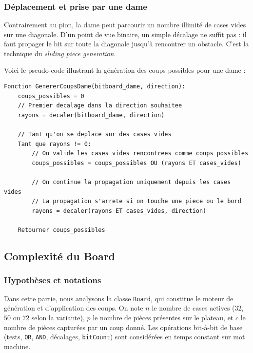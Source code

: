 \documentclass[a4paper]{article}
\begin{document}
\subsubsection{Déplacement et prise par une dame}

Contrairement au pion, la dame peut parcourir un nombre illimité de cases vides sur une diagonale. 
D'un point de vue binaire, un simple décalage ne suffit pas : il faut propager le bit sur toute la diagonale 
jusqu'à rencontrer un obstacle. C'est la technique du \textit{sliding piece generation}.

Voici le pseudo-code illustrant la génération des coups possibles pour une dame :

{ \small
\begin{verbatim}
Fonction GenererCoupsDame(bitboard_dame, direction):
    coups_possibles = 0
    // Premier decalage dans la direction souhaitee
    rayons = decaler(bitboard_dame, direction)
    
    // Tant qu'on se deplace sur des cases vides
    Tant que rayons != 0:
        // On valide les cases vides rencontrees comme coups possibles
        coups_possibles = coups_possibles OU (rayons ET cases_vides)
        
        // On continue la propagation uniquement depuis les cases vides
        // La propagation s'arrete si on touche une piece ou le bord
        rayons = decaler(rayons ET cases_vides, direction)
        
    Retourner coups_possibles
\end{verbatim}
}
\FloatBarrier

\subsection{Complexité du Board}

\subsubsection{Hypothèses et notations}

Dans cette partie, nous analysons la classe \texttt{Board}, qui constitue le moteur de génération et d'application des coups.
On note $n$ le nombre de cases actives (\(32\), \(50\) ou \(72\) selon la variante), $p$ le nombre de pièces présentes
sur le plateau, et $c$ le nombre de pièces capturées par un coup donné. Les opérations bit-à-bit de base
(tests, \texttt{OR}, \texttt{AND}, décalages, \texttt{bitCount}) sont considérées en temps constant sur mot machine.
\end{document}
